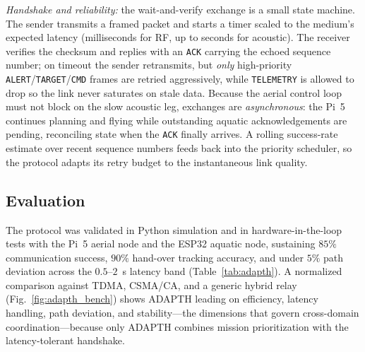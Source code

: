 \documentclass[journal]{IEEEtran}
\begin{document}
\emph{Handshake and reliability:} the wait-and-verify exchange is a small state
machine. The sender transmits a framed packet and starts a timer scaled to the
medium's expected latency (milliseconds for RF, up to seconds for acoustic). The
receiver verifies the checksum and replies with an \texttt{ACK} carrying the echoed
sequence number; on timeout the sender retransmits, but \emph{only} high-priority
\texttt{ALERT}/\texttt{TARGET}/\texttt{CMD} frames are retried aggressively, while
\texttt{TELEMETRY} is allowed to drop so the link never saturates on stale data.
Because the aerial control loop must not block on the slow acoustic leg, exchanges
are \emph{asynchronous}: the Pi~5 continues planning and flying while outstanding
aquatic acknowledgements are pending, reconciling state when the \texttt{ACK}
finally arrives. A rolling success-rate estimate over recent sequence numbers feeds
back into the priority scheduler, so the protocol adapts its retry budget to the
instantaneous link quality.

\subsection{Evaluation}
The protocol was validated in Python simulation and in hardware-in-the-loop tests
with the Pi~5 aerial node and the ESP32 aquatic node, sustaining $85\%$
communication success, $90\%$ hand-over tracking accuracy, and under $5\%$ path
deviation across the $0.5$--$2$~s latency band (Table~\ref{tab:adapth}). A
normalized comparison against TDMA, CSMA/CA, and a generic hybrid relay
(Fig.~\ref{fig:adapth_bench}) shows ADAPTH leading on efficiency, latency handling,
path deviation, and stability---the dimensions that govern cross-domain
coordination---because only ADAPTH combines mission prioritization with the
latency-tolerant handshake.
\end{document}
